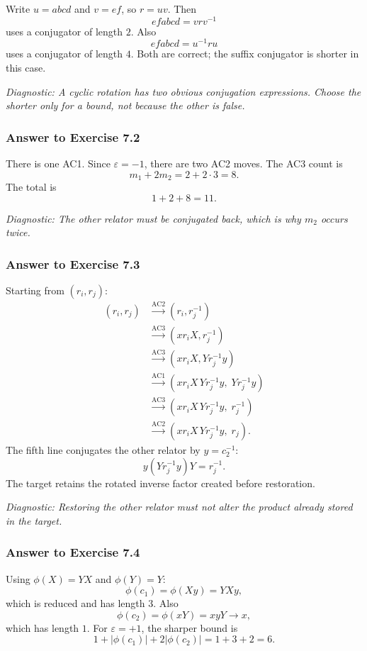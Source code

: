 \documentclass[11pt]{article}
\theoremstyle{definition}
\theoremstyle{remark}
\newcommand{\AC}{\mathrm{AC}}
\newcommand{\len}[1]{\left|#1\right|}
\newcommand{\eps}{\varepsilon}
\newcommand{\diagnostic}[1]{\par\smallskip\textit{Diagnostic: #1}}
\begin{document}
Write \(u=abcd\) and \(v=ef\), so \(r=uv\).  Then
\[
efabcd=v r v^{-1}
\]
uses a conjugator of length \(2\).  Also
\[
efabcd=u^{-1} r u
\]
uses a conjugator of length \(4\).  Both are correct; the suffix
conjugator is shorter in this case.

\diagnostic{A cyclic rotation has two obvious conjugation expressions.
Choose the shorter only for a bound, not because the other is false.}

\subsubsection*{Answer to Exercise 7.2}

There is one AC1.  Since \(\eps=-1\), there are two AC2 moves.  The AC3
count is
\[
m_1+2m_2=2+2\cdot3=8.
\]
The total is
\[
1+2+8=\boxed{11}.
\]

\diagnostic{The other relator must be conjugated back, which is why
\(m_2\) occurs twice.}

\subsubsection*{Answer to Exercise 7.3}

Starting from \((r_i,r_j)\):
\begin{align*}
(r_i,r_j)
&\xrightarrow{\AC2}(r_i,r_j^{-1})\\
&\xrightarrow{\AC3}(x r_iX,r_j^{-1})\\
&\xrightarrow{\AC3}(x r_iX,Yr_j^{-1}y)\\
&\xrightarrow{\AC1}
  (x r_iX\,Yr_j^{-1}y,\;Yr_j^{-1}y)\\
&\xrightarrow{\AC3}
  (x r_iX\,Yr_j^{-1}y,\;r_j^{-1})\\
&\xrightarrow{\AC2}
  (x r_iX\,Yr_j^{-1}y,\;r_j).
\end{align*}
The fifth line conjugates the other relator by \(y=c_2^{-1}\):
\[
y(Yr_j^{-1}y)Y=r_j^{-1}.
\]
The target retains the rotated inverse factor created before restoration.

\diagnostic{Restoring the other relator must not alter the product already
stored in the target.}

\subsubsection*{Answer to Exercise 7.4}

Using \(\phi(X)=YX\) and \(\phi(Y)=Y\):
\[
\phi(c_1)=\phi(Xy)=YXy,
\]
which is reduced and has length \(3\).  Also
\[
\phi(c_2)=\phi(xY)=xyY\longrightarrow x,
\]
which has length \(1\).  For \(\eps=+1\), the sharper bound is
\[
1+\len{\phi(c_1)}+2\len{\phi(c_2)}
=1+3+2=\boxed{6}.
\]
\end{document}
